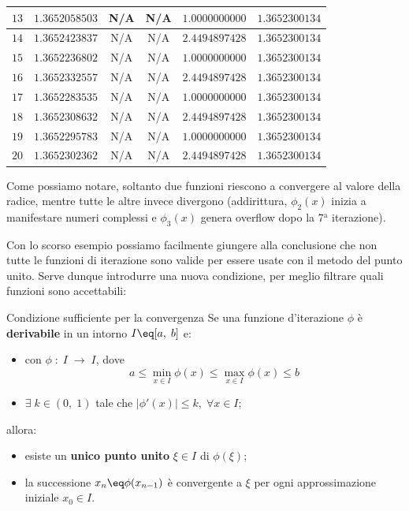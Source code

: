 \begin{example}
\begin{center}
{\begin{tabular}{|c|c|c|c|c|c|}
                $13$ & $1.3652058503$ & N/A & N/A & $1.0000000000$ & $1.3652300134$ \\
                \hline 
                $14$ & $1.3652423837$ & N/A & N/A & $2.4494897428$ & $1.3652300134$ \\
                \hline 
                $15$ & $1.3652236802$ & N/A & N/A & $1.0000000000$ & $1.3652300134$ \\
                \hline 
                $16$ & $1.3652332557$ & N/A & N/A & $2.4494897428$ & $1.3652300134$ \\
                \hline 
                $17$ & $1.3652283535$ & N/A & N/A & $1.0000000000$ & $1.3652300134$ \\
                \hline 
                $18$ & $1.3652308632$ & N/A & N/A & $2.4494897428$ & $1.3652300134$ \\
                \hline 
                $19$ & $1.3652295783$ & N/A & N/A & $1.0000000000$ & $1.3652300134$ \\
                \hline 
                $20$ & $1.3652302362$ & N/A & N/A & $2.4494897428$ & $1.3652300134$ \\
                \hline
            \end{tabular}
        }
    \end{center}

    Come possiamo notare, soltanto due funzioni riescono a convergere al valore della radice, mentre tutte le altre invece divergono (addirittura, $\phi_2(x)$ inizia a manifestare numeri complessi e $\phi_3(x)$ genera overflow dopo la 7$^{\text{a}}$ iterazione).
\end{example}

Con lo scorso esempio possiamo facilmente giungere alla conclusione che non tutte le funzioni di iterazione sono valide per essere usate con il metodo del punto unito. Serve dunque introdurre una nuova condizione, per meglio filtrare quali funzioni sono accettabili:

\begin{theorem}{Condizione sufficiente per la convergenza}
    Se una funzione d'iterazione $\phi$ è \textbf{derivabile} in un intorno $I \eq [a, \; b]$ e:
    \begin{itemize}
        \item con $\phi \; : \; I \; \longrightarrow \; I$, dove
        \[ a \leq \min_{x \in I} \phi(x) \leq \max_{x \in I} \phi(x) \leq b \]
        \item $\exists \; k \in (0, \; 1)$ tale che $|\phi'(x)| \leq k, \; \forall x \in I$;
    \end{itemize}

    allora:
    \begin{itemize}
        \item esiste un \textbf{unico punto unito} $\xi \in I$ di $\phi(\xi)$;
        \item la successione $x_n \eq \phi(x_{n - 1})$ è convergente a $\xi$ per ogni approssimazione iniziale $x_0 \in I$.
    \end{itemize}
\end{theorem}